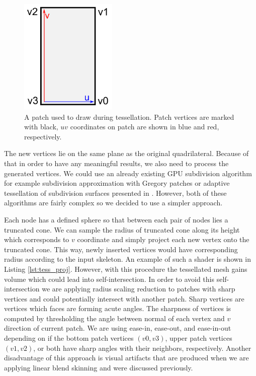 \begin{figure}[h]
    \centering
    \includegraphics[height=15em]{images/tess_patch}
    \caption[Tessellation patch]{A patch used to draw during tessellation. Patch vertices are marked with black, $uv$ coordinates on patch are shown in blue and red, respectively.}
    \label{fig:tess_patch}
\end{figure}

The new vertices lie on the same plane as the original quadrilateral.
Because of that in order to have any meaningful results, we also need to process the generated vertices.
We could use an already existing GPU subdivision algorithm for example subdivision approximation with Gregory patches \cite{gregory_patch} or adaptive tessellation of subdivision surfaces presented in \cite{gpu_gems_2}.
However, both of these algorithms are fairly complex so we decided to use a simpler approach.

Each node has a defined sphere so that between each pair of nodes lies a truncated cone.
We can sample the radius of truncated cone along its height which corresponds to $v$ coordinate and simply project each new vertex onto the truncated cone.
This way, newly inserted vertices would have corresponding radius according to the input skeleton.
An example of such a shader is shown in Listing \ref{lst:tess_proj}.
However, with this procedure the tessellated mesh gains volume which could lead into self-intersection.
In order to avoid this self-intersection we are applying radius scaling reduction to patches with sharp vertices and could potentially intersect with another patch.
Sharp vertices are vertices which faces are forming acute angles.
The sharpness of vertices is computed by thresholding the angle between normal of each vertex and $v$ direction of current patch.
We are using ease-in, ease-out, and ease-in-out depending on if the bottom patch vertices $(v0, v3)$, upper patch vertices $(v1, v2)$, or both have sharp angles with their neighbors, respectively.
Another disadvantage of this approach is visual artifacts that are produced when we are applying linear blend skinning and were discussed previously.

